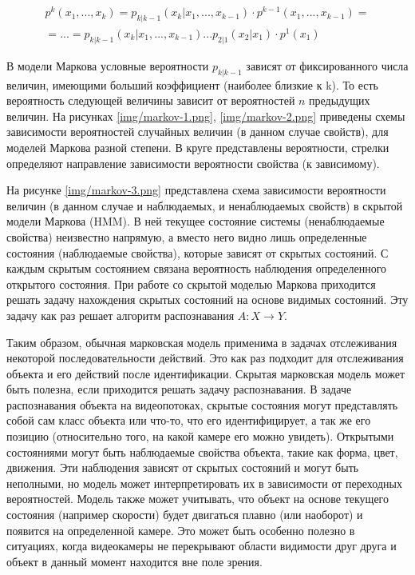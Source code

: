 \begin{multline}
p^k(x_1, ..., x_k) = p_{k|k-1}(x_k|x_1, ... , x_{k-1}) \cdot p^{k-1}(x_1, ... , x_{k-1}) = \\
= ... = p_{k|k-1}(x_k|x_1, ... , x_{k -1}) ... p_{2|1}(x_2|x_1) \cdot p^1(x_1)
\label{formula6}
\end{multline}

В модели Маркова условные вероятности $p_{k|k-1}$ зависят от фиксированного числа величин, имеющими больший коэффициент (наиболее близкие к k). То есть вероятность следующей величины зависит от вероятностей $n$ предыдущих величин. На рисунках \ref{img/markov-1.png}, \ref{img/markov-2.png} приведены схемы зависимости вероятностей случайных величин (в данном случае свойств), для моделей Маркова разной степени. В круге представлены вероятности, стрелки определяют направление зависимости вероятности свойства (к зависимому). 



На рисунке \ref{img/markov-3.png} представлена схема зависимости вероятности величин (в данном случае и наблюдаемых, и ненаблюдаемых свойств) в скрытой модели Маркова (HMM). В ней текущее состояние системы (ненаблюдаемые свойства) неизвестно напрямую, а вместо него видно лишь определенные состояния (наблюдаемые свойства), которые зависят от скрытых состояний. С каждым скрытым состоянием связана вероятность наблюдения определенного открытого состояния. При работе со скрытой моделью Маркова приходится решать задачу нахождения скрытых состояний на основе видимых состояний. Эту задачу как раз решает алгоритм распознавания $A: X \rightarrow Y$.

Таким образом, обычная марковская модель применима в задачах отслеживания некоторой последовательности действий. Это как раз подходит для отслеживания объекта и его действий после идентификации. Скрытая марковская модель может быть полезна, если приходится решать задачу распознавания. В задаче распознавания объекта на видеопотоках, скрытые состояния могут представлять собой сам класс объекта или что-то, что его идентифицирует, а так же его позицию (относительно того, на какой камере его можно увидеть). Открытыми состояниями могут быть наблюдаемые свойства объекта, такие как форма, цвет, движения. Эти наблюдения зависят от скрытых состояний и могут быть неполными, но модель может интерпретировать их в зависимости от переходных вероятностей. Модель также может учитывать, что объект на основе текущего состояния (например скорости) будет двигаться плавно (или наоборот) и появится на определенной камере. Это может быть особенно полезно в ситуациях, когда видеокамеры не перекрывают области видимости друг друга и объект в данный момент находится вне поле зрения.

